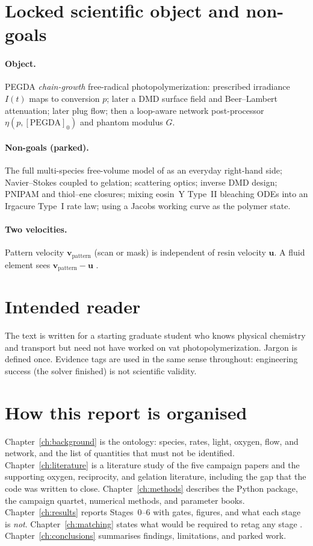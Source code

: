 \section{Locked scientific object and non-goals}

\paragraph{Object.}
PEGDA \emph{chain-growth} free-radical photopolymerization: prescribed irradiance $I(t)$ maps to conversion $p$; later a DMD surface field and Beer--Lambert attenuation; later plug flow; then a loop-aware network post-processor $\eta(p,[\mathrm{PEGDA}]_0)$ and phantom modulus $G$.

\paragraph{Non-goals (parked).}
The full multi-species free-volume model of \citet{Dobson2024} as an everyday right-hand side; Navier--Stokes coupled to gelation; scattering optics; inverse DMD design; PNIPAM and thiol--ene closures; mixing eosin~Y Type~II bleaching ODEs into an Irgacure Type~I rate law; using a Jacobs working curve as the polymer state.

\paragraph{Two velocities.}
Pattern velocity $\mathbf{v}_{\mathrm{pattern}}$ (scan or mask) is independent of resin velocity $\mathbf{u}$.
A fluid element sees $\mathbf{v}_{\mathrm{pattern}}-\mathbf{u}$ \citep{Meenakshisundaram2020,Slutzky2019}.

\section{Intended reader}

The text is written for a starting graduate student who knows physical chemistry and transport but need not have worked on vat photopolymerization.
Jargon is defined once.
Evidence tags are used in the same sense throughout: engineering success (the solver finished) is not scientific validity.

\section{How this report is organised}

Chapter~\ref{ch:background} is the ontology: species, rates, light, oxygen, flow, and network, and the list of quantities that must not be identified.
Chapter~\ref{ch:literature} is a literature study of the five campaign papers and the supporting oxygen, reciprocity, and gelation literature, including the gap that the code was written to close.
Chapter~\ref{ch:methods} describes the Python package, the campaign quartet, numerical methods, and parameter books.
Chapter~\ref{ch:results} reports Stages~0--6 with gates, figures, and what each stage is \emph{not}.
Chapter~\ref{ch:matching} states what would be required to retag any stage \tagmatch.
Chapter~\ref{ch:conclusions} summarises findings, limitations, and parked work.

